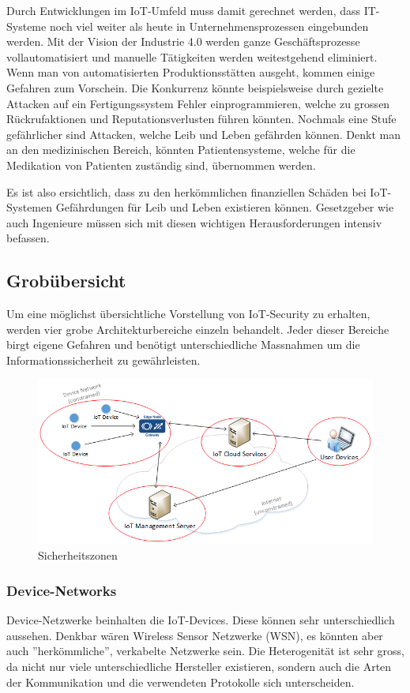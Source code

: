 Durch Entwicklungen im IoT-Umfeld muss damit gerechnet werden, dass IT-Systeme noch viel weiter als heute in Unternehmensprozessen eingebunden werden. Mit der Vision der Industrie 4.0 werden ganze Geschäftsprozesse vollautomatisiert und manuelle Tätigkeiten werden weitestgehend eliminiert. Wenn man von automatisierten Produktionsstätten ausgeht, kommen einige Gefahren zum Vorschein. Die Konkurrenz könnte beispielsweise durch gezielte Attacken auf ein Fertigungssystem Fehler einprogrammieren, welche zu grossen Rückrufaktionen und Reputationsverlusten führen könnten. Nochmals eine Stufe gefährlicher sind Attacken, welche Leib und Leben gefährden können. Denkt man an den medizinischen Bereich, könnten Patientensysteme, welche für die Medikation von Patienten zuständig sind, übernommen werden.

Es ist also ersichtlich, dass zu den herkömmlichen finanziellen Schäden bei IoT-Systemen Gefährdungen für Leib und Leben existieren können. Gesetzgeber wie auch Ingenieure müssen sich mit diesen wichtigen Herausforderungen intensiv befassen.

\subsection{Grobübersicht}  
Um eine möglichst übersichtliche Vorstellung von IoT-Security zu erhalten, werden vier grobe Architekturbereiche einzeln behandelt. Jeder dieser Bereiche birgt eigene Gefahren und benötigt unterschiedliche Massnahmen um die Informationssicherheit zu gewährleisten.
\begin{figure}[H]
\centering
\includegraphics[scale=0.8]{../02_Analyse/images/security_overview.png}
\caption{Sicherheitszonen}
\end{figure}
\subsubsection{Device-Networks}
Device-Netzwerke beinhalten die IoT-Devices. Diese können sehr unterschiedlich aussehen. Denkbar wären Wireless Sensor Netzwerke (WSN), es könnten aber auch ''herkömmliche'', verkabelte Netzwerke sein. Die Heterogenität ist sehr gross, da nicht nur viele unterschiedliche Hersteller existieren, sondern auch die Arten der Kommunikation und die verwendeten Protokolle sich unterscheiden. 

